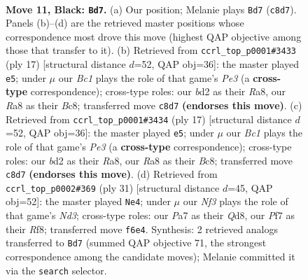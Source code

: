 \documentclass[11pt]{article}
\begin{document}
\clearpage

\begin{figure}[p]\centering
\begin{subfigure}{0.46\textwidth}\centering
\resizebox{\linewidth}{!}{%
\newchessgame
\chessboard[
  setfen={r1b1r1k1/ppp1qppp/2n1pn2/8/2BP3P/4PNP1/PP1B1P2/R2QK2R b KQ - 0 11},
  showmover=false,
  pgfstyle=straightmove, color=movearrow, markmove={c8-d7}
]}
\caption{}
\end{subfigure}\hfill
\begin{subfigure}{0.46\textwidth}\centering
\resizebox{\linewidth}{!}{%
\newchessgame
\chessboard[
  setfen={r1b2rk1/ppp1qppp/2nppn2/8/2PP4/P1BBPN2/1P3PPP/R2QK2R b KQ - 2 9},
  showmover=false,
  pgfstyle=straightmove, color=movearrow, markmove={e6-e5}
]}
\caption{}
\end{subfigure}
\\[4pt]
\begin{subfigure}{0.46\textwidth}\centering
\resizebox{\linewidth}{!}{%
\newchessgame
\chessboard[
  setfen={r1b2rk1/ppp1qppp/2nppn2/8/2PP4/P1BBPN2/1P3PPP/R2QK2R b KQ - 2 9},
  showmover=false,
  pgfstyle=straightmove, color=movearrow, markmove={e6-e5}
]}
\caption{}
\end{subfigure}\hfill
\begin{subfigure}{0.46\textwidth}\centering
\resizebox{\linewidth}{!}{%
\newchessgame
\chessboard[
  setfen={r2q1rk1/ppp1pp2/3nb2p/3n2p1/8/2P2NP1/P2BPPBP/R2QK2R b KQ - 1 16},
  showmover=false,
  pgfstyle=straightmove, color=movearrow, markmove={d6-e4}
]}
\caption{}
\end{subfigure}
\caption{\textbf{Move 11, Black: \texttt{Bd7}.} (a) Our position; Melanie plays \texttt{Bd7} (\texttt{c8d7}). Panels (b)--(d) are the retrieved master positions whose correspondence most drove this move (highest QAP objective among those that transfer to it). (b) Retrieved from \texttt{ccrl\_top\_p0001\#3433} (ply 17) [structural distance $d$=52, QAP obj=36]: the master played \texttt{e5}; under $\mu$ our \emph{Bc1} plays the role of that game's \emph{Pe3} (a \textbf{cross-type} correspondence); cross-type roles: our \emph{b}d2 as their \emph{R}a8, our \emph{R}a8 as their \emph{B}c8; transferred move \texttt{c8d7} \textbf{(endorses this move)}. (c) Retrieved from \texttt{ccrl\_top\_p0001\#3434} (ply 17) [structural distance $d$=52, QAP obj=36]: the master played \texttt{e5}; under $\mu$ our \emph{Bc1} plays the role of that game's \emph{Pe3} (a \textbf{cross-type} correspondence); cross-type roles: our \emph{b}d2 as their \emph{R}a8, our \emph{R}a8 as their \emph{B}c8; transferred move \texttt{c8d7} \textbf{(endorses this move)}. (d) Retrieved from \texttt{ccrl\_top\_p0002\#369} (ply 31) [structural distance $d$=45, QAP obj=52]: the master played \texttt{Ne4}; under $\mu$ our \emph{Nf3} plays the role of that game's \emph{Nd3}; cross-type roles: our \emph{P}a7 as their \emph{Q}d8, our \emph{P}f7 as their \emph{R}f8; transferred move \texttt{f6e4}. Synthesis: 2 retrieved analogs transferred to \texttt{Bd7} (summed QAP objective 71, the strongest correspondence among the candidate moves); Melanie committed it via the \texttt{search} selector.}
\label{fig:thought-m21}
\end{figure}
\end{document}
